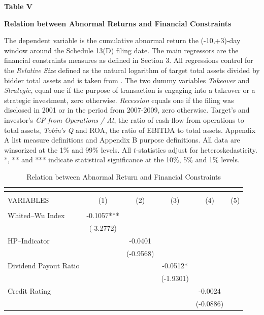 \documentclass[12pt]{article}
\begin{document}
\begin{table}[!htbp]
	\centering
	\captionsetup{textformat=empty,labelformat=blank}
	\caption{Relation between Abnormal Return and Financial Constraints}
	\textbf{Table V}\par\medskip
	\large\textbf{Relation between Abnormal Returns and Financial Constraints}\par\medskip
	\justifying
	\footnotesize\noindent{} The dependent variable is the cumulative abnormal return the (-10,+3)-day window around the Schedule 13(D) filing date. The main regressors are the financial constraints measures as defined in Section 3. All regressions control for the \emph{Relative Size} defined as the natural logarithm of target total assets divided by bidder total assets and is taken from \citet[p.112]{Khatami2014}. The two dummy variables \emph{Takeover} and \emph{Strategic}, equal one if the purpose of transaction is engaging into a takeover or a strategic investment, zero otherwise. \emph{Recession} equals one if the filing was disclosed in 2001 or in the period from 2007-2009, zero otherwise. Target's and investor's \emph{CF from Operations / At}, the ratio of cash-flow from operations to total assets, \emph{Tobin's Q} and ROA, the ratio of EBITDA to total assets. Appendix A list measure definitions and Appendix B purpose definitions. All data are winsorized at the 1\% and 99\% levels. All $t$-statistics adjust for heteroskedasticity. *, ** and *** indicate statistical significance at the 10\%, 5\% and 1\% levels.\par\medskip									
	\begin{adjustbox}{max width=\textwidth}
		\begin{tabular}{lccccc}
			\multicolumn{6}{c}{} \\ \hline
			\\
			VARIABLES & (1) &(2) & (3)& (4) & (5)\\ \hline
			 &  &  &  &  &  \\
			Whited--Wu Index & -0.1057*** &  &  &  &  \\
			 & (-3.2772) &  &  &  &  \\
			HP--Indicator &  & -0.0401 &  &  &  \\
			 &  & (-0.9568) &  &  &  \\
			Dividend Payout Ratio &  &  & -0.0512* &  &  \\
			 &  &  & (-1.9301) &  &  \\
			Credit Rating &  &  &  & -0.0024 &  \\
			 &  &  &  & (-0.0886) &  \\

\end{tabular}
\end{adjustbox}
\end{table}
\end{document}
